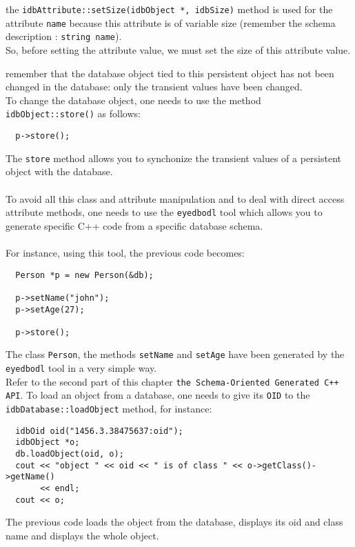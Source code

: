 \ee
\item the \texttt{idbAttribute::setSize(idbObject *, idbSize)} method is
used for the attribute \texttt{name} because this attribute is of variable
size (remember the schema description : \texttt{string name}).
\\
So, before setting the attribute value, we must set the size of this
attribute value.
\item remember that the database object tied to this persistent object has not
been changed in the database: only the transient values have been changed.
\\
To change the database object, one needs to use the method
\texttt{idbObject::store()} as follows:
\verbsize
\begin{verbatim}
  p->store();
\end{verbatim}
\normalsize
The \texttt{store} method allows you to synchonize the transient values
of a persistent object with the database.
\\
\\
To avoid all this class and attribute manipulation and to deal with
direct access attribute methods, one needs to use the \texttt{eyedbodl}
tool which allows you to generate specific C++ code from a specific database
schema.
\\
\\
For instance, using this tool, the previous code becomes:
\verbsize
\begin{verbatim}
  Person *p = new Person(&db);

  p->setName("john");
  p->setAge(27);

  p->store();
\end{verbatim}
\normalsize
The class \texttt{Person}, the methods \texttt{setName} and \texttt{setAge}
have been generated by the \texttt{eyedbodl} tool in a very simple way.
\\
Refer to the second part of this chapter \texttt{the Schema-Oriented
Generated C++ API}.
\ee
{}
To load an object from a database, one needs to give its \texttt{OID} to
the \texttt{idbDatabase::loadObject} method, for instance:
\verbsize
\begin{verbatim}
  idbOid oid("1456.3.38475637:oid");
  idbObject *o;
  db.loadObject(oid, o);
  cout << "object " << oid << " is of class " << o->getClass()->getName()
       << endl;
  cout << o;
\end{verbatim}
\normalsize
The previous code loads the object from the database, displays its
oid and class name and displays the whole object.
